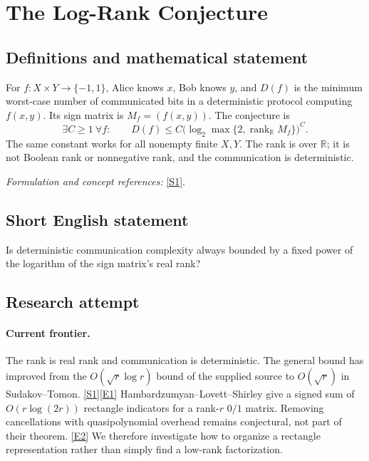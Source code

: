 \documentclass[11pt,a4paper]{article}
\newcommand{\R}{\mathbb{R}}
\newcommand{\sref}[2]{\hyperlink{source:#1:#2}{[S#2]}}
\newcommand{\eref}[2]{\hyperlink{extra:#1:#2}{[E#2]}}
\newif\ifshowcatalogue
\newcommand{\cataloguescope}[1]{\ifshowcatalogue
 \paragraph{Exact scope in the supplied catalogue.}
 \begin{quote}\small #1\end{quote}\fi}
\numberwithin{equation}{section}
\begin{document}
\setcounter{section}{0}
\clearpage
\section*{\texorpdfstring{The Log-Rank Conjecture}{The Log-Rank Conjecture}}\label{statement}
\subsection{Definitions and mathematical statement}
For $f:X\times Y\to\{-1,1\}$, Alice knows $x$, Bob knows $y$, and $D(f)$ is the minimum worst-case number of communicated bits in a deterministic protocol computing $f(x,y)$. Its sign matrix is $M_f=(f(x,y))$. The conjecture is
\[
 \exists C\ge1\ \forall f:\qquad
 D(f)\le C\bigl(\log_2\max\{2,\operatorname{rank}_{\R}M_f\}\bigr)^C.
\]
The same constant works for all nonempty finite $X,Y$. The rank is over $\R$; it is not Boolean rank or nonnegative rank, and the communication is deterministic.
\par\smallskip\textit{Formulation and concept references:} \sref{statement}{1}.
\cataloguescope{Prove that there is a universal constant C >= 1 such that, for every Boolean function f:X x Y -> \{-1,1\} on finite nonempty sets X,Y, D(f) <= C[log\_2 max\{2,rank\_R(M\_f)\}]\textasciicircum{}C, where M\_f(x,y)=f(x,y) is its sign communication matrix and D(f) is deterministic two-party communication complexity in bits.}
\subsection{Short English statement}
Is deterministic communication complexity always bounded by a fixed power of the logarithm of the sign matrix's real rank?
\subsection{Research attempt}

\paragraph{Current frontier.}
The rank is real rank and communication is deterministic. The general bound
has improved from the $O(\sqrt r\log r)$ bound of the supplied source to
$O(\sqrt r)$ in Sudakov--Tomon. \sref{statement}{1}\eref{statement}{1}
Hambardzumyan--Lovett--Shirley give a signed sum of $O(r\log(2r))$ rectangle
indicators for a rank-$r$ $0/1$ matrix. Removing cancellations with
quasipolynomial overhead remains conjectural, not part of their theorem.
\eref{statement}{2} We therefore investigate how to organize a rectangle
representation rather than simply find a low-rank factorization.
\end{document}
